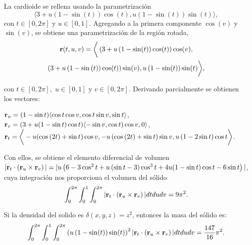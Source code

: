 

La cardioide se rellena usando la parametrización
%
\[\langle 3+u\left( 1-\sin (t) \right) \cos (t),u\left( 1-\sin (t) \right) \sin (t) \rangle,\]
%
con $t\in [0,2\pi]$ y $u\in [0,1]$.
Agregando a la primera componente $\cos(v)$ y $\sin(v)$, se obtiene una parametrización de la región rotada,
\begin{multline*}
{\bf r}(t,u,v)=\bigg \langle\left ( 3+u\left( 1-\sin (t) \right) \cos (t) \right) \cos (v) , \\ \left( 3+u\left( 1-\sin \left(
t\right) \right) \cos (t) \right) \sin (v) ,u\left(1-\sin (t) \right) \sin (t) \bigg \rangle,
\end{multline*}

con $t\in [0,2\pi ],\,\, u\in [0,1]$ y $v\in [0,2\pi]$.
Derivando parcialmente se obtienen los vectores:

${\bf r}_{u} = ( 1-\sin t) \langle \cos t\cos v, \cos t\sin v, \sin t\rangle $, \\
${\bf r}_{v} = (3+u(1-\sin t) \cos t) \langle -
\sin v,\cos t) \cos v,0\rangle $, \\
${\bf r}_{t} = \bigg \langle -u( \cos \left( 2t\right) +\sin t) \cos
v,-u\left( \cos \left( 2t\right) +\sin t\right) \sin v, \\
u\left( 1-2\sin t\right) \cos t \bigg \rangle$.

Con ellos, se obtiene el elemento diferencial de volumen
$|{\bf r}_{t}\cdot \left( {\bf r}_{u}\times {\bf r}_{v}\right)| =
|u\left( 6-3\cos ^{2}t+u\left(\sin t-3\right) \cos ^{3}t+4u(1-\sin t)\cos t-6\sin t\right)|$,
cuya integración nos proporciona el volumen del sólido
%
\[\int_{0}^{2\pi }\int_{0}^{1}\int_{0}^{2\pi} |{\bf r}_{t}\cdot \left( {\bf r}_{u}\times {\bf r}_{v}\right)|
dtdudv= 9\pi ^{2}.\]

Si la densidad del solido es $\delta \left( x,y,z\right) =z^{2}$, entonces la masa del sólido es:
%
\begin{equation*}
\int_{0}^{2\pi }\int_{0}^{1}\int_{0}^{2\pi}\left(u\left(1-\sin(t)\right)\sin(t)\right)^{2}|{\bf r}_{t}\cdot\left({\bf r}_{u}\times {\bf r}_{v}\right)|dtdudv= \frac{147}{16}\pi ^{2}.
\end{equation*}

